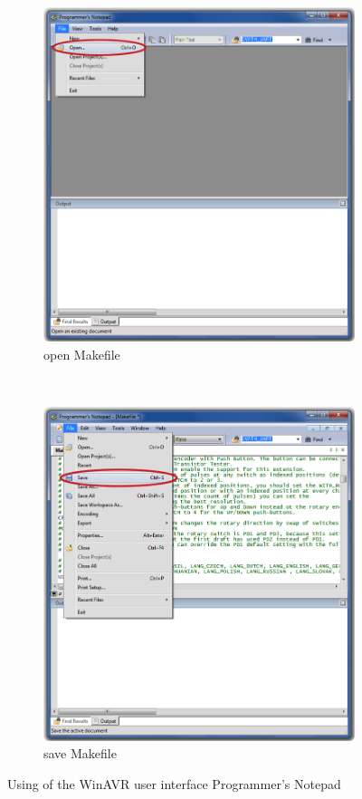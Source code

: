 \begin{figure}[H]
  \begin{subfigure}[b]{.5\textwidth}
    \centering
    \includegraphics[width=.85\textwidth]{../PNG/Notepad_open.png}
    \caption{open Makefile}
  \end{subfigure}
  ~
  \begin{subfigure}[b]{.5\textwidth}
    \centering
    \includegraphics[width=.85\textwidth]{../PNG/Notepad_save.png}
    \caption{save Makefile}
  \end{subfigure}
  \caption{Using of the WinAVR user interface Programmer's Notepad}
  \label{fig:WinAVR1}
\end{figure}

